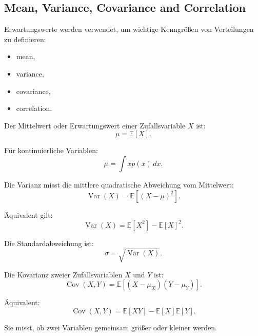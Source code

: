 \documentclass[11pt,a4paper]{scrartcl}
\begin{document}
\subsection{Mean, Variance, Covariance and Correlation}

\begin{notebox}
    Erwartungswerte werden verwendet, um wichtige Kenngrößen von Verteilungen zu
    definieren:

    \begin{itemize}
        \item mean,
        \item variance,
        \item covariance,
        \item correlation.
    \end{itemize}
\end{notebox}

\begin{calculationbox}
    Der Mittelwert oder Erwartungswert einer Zufallsvariable \(X\) ist:
    \[
        \mu
        =
        \mathbb{E}[X].
    \]

    Für kontinuierliche Variablen:
    \[
        \mu
        =
        \int x p(x)\,dx.
    \]
\end{calculationbox}

\begin{calculationbox}
    Die Varianz misst die mittlere quadratische Abweichung vom Mittelwert:
    \[
        \operatorname{Var}(X)
        =
        \mathbb{E}\left[(X-\mu)^2\right].
    \]

    Äquivalent gilt:
    \[
        \operatorname{Var}(X)
        =
        \mathbb{E}[X^2]
        -
        \mathbb{E}[X]^2.
    \]

    Die Standardabweichung ist:
    \[
        \sigma
        =
        \sqrt{\operatorname{Var}(X)}.
    \]
\end{calculationbox}

\begin{calculationbox}
    Die Kovarianz zweier Zufallsvariablen \(X\) und \(Y\) ist:
    \[
        \operatorname{Cov}(X,Y)
        =
        \mathbb{E}\left[(X-\mu_X)(Y-\mu_Y)\right].
    \]

    Äquivalent:
    \[
        \operatorname{Cov}(X,Y)
        =
        \mathbb{E}[XY]
        -
        \mathbb{E}[X]\mathbb{E}[Y].
    \]

    Sie misst, ob zwei Variablen gemeinsam größer oder kleiner werden.
\end{calculationbox}
\end{document}
